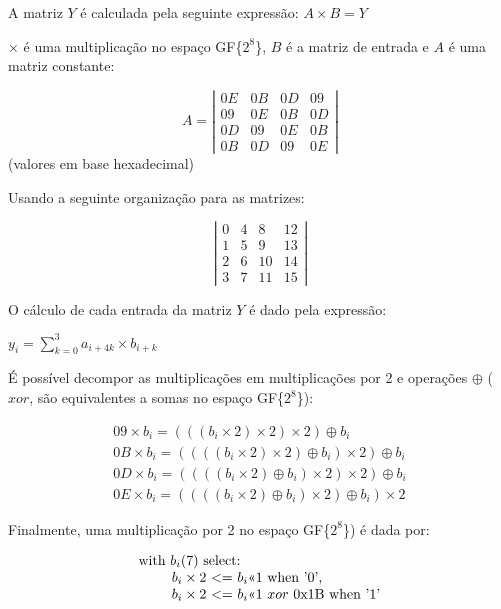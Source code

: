 A matriz $Y$ é calculada pela seguinte expressão: $A \times B = Y$

$\times$ é uma multiplicação no espaço GF\{$2^{8}$\}, $B$ é a matriz de entrada e $A$ é uma matriz constante: 

\[A = \left| \begin{array}{cccc}
0E & 0B & 0D & 09 \\
09 & 0E & 0B & 0D \\
0D & 09 & 0E & 0B \\
0B & 0D & 09 & 0E \end{array} \right|\]
\center (valores em base hexadecimal)

\flushleft Usando a seguinte organização para as matrizes:

\[\left| \begin{array}{cccc}
0 & 4 & 8 & 12 \\
1 & 5 & 9 & 13 \\
2 & 6 & 10 & 14 \\
3 & 7 & 11 & 15 \end{array} \right|\]

O cálculo de cada entrada da matriz $Y$ é dado pela expressão:

\center $y_i = \sum\limits_{k=0}^3 a_{i+4k} \times b_{i+k}$

\flushleft É possível decompor as multiplicações em multiplicações por 2 e operações $\oplus$ ($xor$, são equivalentes a somas no espaço GF\{$2^{8}$\}):

\[ \begin{array}{lcr}
\mbox{$09 \times b_i = (((b_i \times 2) \times 2) \times 2) \oplus b_i$} \\ 
\mbox{$0B \times b_i = ((((b_i \times 2) \times 2) \oplus b_i) \times 2) \oplus b_i$} \\
\mbox{$0D \times b_i = ((((b_i \times 2) \oplus b_i) \times 2) \times 2) \oplus b_i$} \\
\mbox{$0E \times b_i = ((((b_i \times 2) \oplus b_i) \times 2) \oplus b_i) \times 2$} \end{array}\]

Finalmente, uma multiplicação por 2 no espaço GF\{$2^{8}$\}) é dada por:

\[ \begin{array}{lcr}
\mbox{with $b_i$(7) select:} \\
\mbox{\phantom{hello} $b_i \times 2$ \textless = $b_i$\textless\textless 1 when '0',} \\
\mbox{\phantom{hello} $b_i \times 2$ \textless = $b_i$\textless\textless 1 $xor$ 0x1B when '1'}
\end{array}\]

